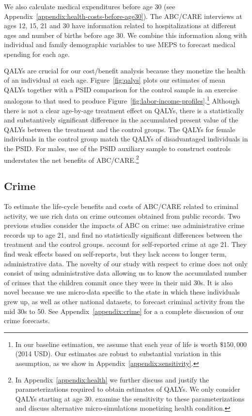 We also calculate medical expenditures before age 30 (see Appendix~\ref{appendix:health-costs-before-age30}). The ABC/CARE interviews at ages 12, 15, 21 and 30 have information related to hospitalizations at different ages and number of births before age 30. We combine this information along with individual and family demographic variables to use MEPS to forecast medical spending for each age.

QALYs are crucial for our cost/benefit analysis because they monetize the health of an individual at each age. Figure~\ref{fig:qalys} plots our estimates of mean QALYs together with a PSID comparison for the control sample in an exercise analogous to that used to produce Figure~\ref{fig:labor-income-profiles}.\footnote{In our baseline estimation, we assume that each year of life is worth  $\$150,000$ (2014 USD). Our estimates are robust to substantial variation in this assumption, as we show in  Appendix~\ref{appendix:sensitivity}.} Although there is not a clear age-by-age treatment effect on QALYs, there is a statistically and substantively significant difference in the accumulated present value of the QALYs between the treatment and the control groups. The QALYs for female individuals in the control group match the QALYs of disadvantaged individuals in the PSID. For males, use of the PSID auxiliary sample to construct controls understates the net benefits of ABC/CARE.\footnote{In  Appendix~\ref{appendix:health} we further discuss and justify the parameterizations required to obtain estimates of QALYs. We only consider QALYs starting at age 30. \citet{Goldman_etal_2015_Future-Adult-Model} examine the sensitivity to these parameterizations and discuss alternative micro-simulations monetizing health condition.}

\subsection{Crime}

To estimate the life-cycle benefits and costs of ABC/CARE related to criminal activity, we use rich data on crime outcomes obtained from public records. Two previous studies consider the impacts of ABC on crime: \citet{Clarke_Campbell_1998_ABC_Comparison_ECRQ} use administrative crime records up to age 21, and find no statistically significant differences between the treatment and the control groups. \cite{Barnett_Masse_2002_benefitcost,Barnett_Masse_2007_EER} account for self-reported crime at age 21. They find weak effects based on self-reports, but they lack access to longer term, administrative data. The novelty of our study with respect to crime does not only consist of using administrative data allowing us to know the accumulated number of crimes that the children commit once they were in their mid 30s. It is also novel because we use micro-data specific to the state in which these individuals grew up, as well as other national datasets, to forecast criminal activity from the mid 30s to 50. See Appendix~\ref{appendix:crime} for a a complete discussion of our crime forecasts.

